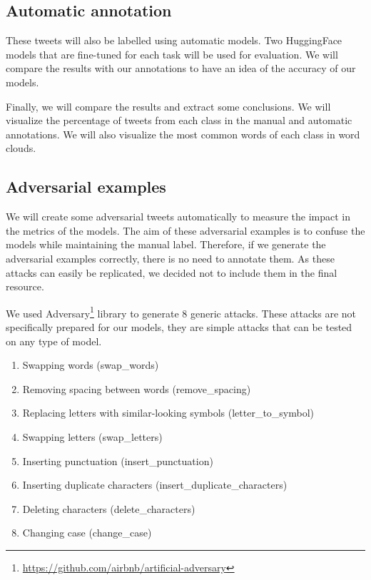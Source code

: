 \documentclass[11pt,a4paper]{article}
\begin{document}
\subsection{Automatic annotation}

These tweets will also be labelled using automatic models. Two HuggingFace models that are fine-tuned for each task will be used for evaluation. We will compare the results with our annotations to have an idea of the accuracy of our models.

Finally, we will compare the results and extract some conclusions. We will visualize the percentage of tweets from each class in the manual and automatic annotations. We will also visualize the most common words of each class in word clouds.

\subsection{Adversarial examples}

We will create some adversarial tweets automatically to measure the impact in the metrics of the models. The aim of these adversarial examples is to confuse the models while maintaining the manual label. Therefore, if we generate the adversarial examples correctly, there is no need to annotate them. As these attacks can easily be replicated, we decided not to include them in the final resource.

We used Adversary\footnote{\url{https://github.com/airbnb/artificial-adversary}} library to generate 8 generic attacks. These attacks are not specifically prepared for our models, they are simple attacks that can be tested on any type of model.

\begin{enumerate}
    \item Swapping words (swap\_words)
    \item Removing spacing between words (remove\_spacing)
    \item Replacing letters with similar-looking symbols (letter\_to\_symbol)
    \item Swapping letters (swap\_letters)
    \item Inserting punctuation (insert\_punctuation)
    \item Inserting duplicate characters (insert\_duplicate\_characters)
    \item Deleting characters (delete\_characters)
    \item Changing case (change\_case)
\end{enumerate}
\end{document}
